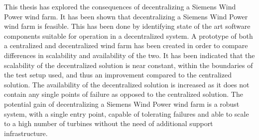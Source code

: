 This thesis has explored the consequences of decentralizing a Siemens Wind Power wind farm. It has been shown that decentralizing a Siemens Wind Power wind farm is feasible. This has been done by identifying state of the art software components suitable for operation in a decentralized system. A prototype of both a centralized and decentralized wind farm has been created in order to compare differences in scalability and availability of the two. It has been indicated that the scalability of the decentralized solution is near constant, within the boundaries of the test setup used, and thus an improvement compared to the centralized solution. The availability of the decentralized solution is increased as it does not contain any single points of failure as opposed to the centralized solution. The potential gain of decentralizing a Siemens Wind Power wind farm is a robust system, with a single entry point, capable of tolerating failures and able to scale to a high number of turbines without the need of additional support infrastructure.